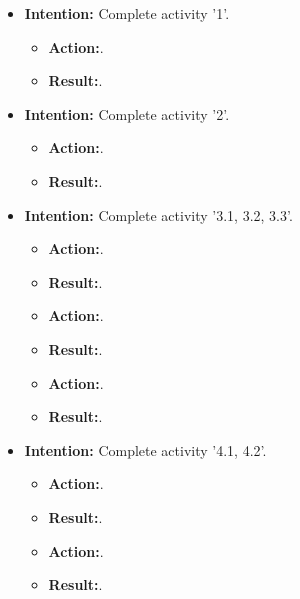 \documentclass{article}
\begin{document}
\begin{itemize}

\item{\textbf{Intention:} Complete activity '1'.}

\begin{itemize}
\item{\textbf{Action:}.}
\item{\textbf{Result:}.}
\end{itemize}

\item{\textbf{Intention:} Complete activity '2'.}

\begin{itemize}
\item{\textbf{Action:}.}
\item{\textbf{Result:}.}
\end{itemize}

\item{\textbf{Intention:} Complete activity '3.1, 3.2, 3.3'.}

\begin{itemize}
\item{\textbf{Action:}.}
\item{\textbf{Result:}.}

\item{\textbf{Action:}.}
\item{\textbf{Result:}.}

\item{\textbf{Action:}.}
\item{\textbf{Result:}.}


\end{itemize}

\item{\textbf{Intention:} Complete activity '4.1, 4.2'.}

\begin{itemize}
\item{\textbf{Action:}.}
\item{\textbf{Result:}.}

\item{\textbf{Action:}.}
\item{\textbf{Result:}.}


\end{itemize}




 
\end{itemize}
\end{document}

